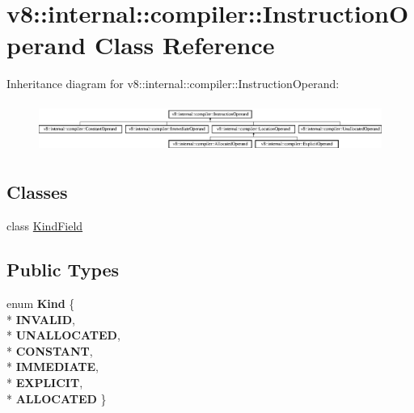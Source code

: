 \hypertarget{classv8_1_1internal_1_1compiler_1_1_instruction_operand}{}\section{v8\+:\+:internal\+:\+:compiler\+:\+:Instruction\+Operand Class Reference}
\label{classv8_1_1internal_1_1compiler_1_1_instruction_operand}
Inheritance diagram for v8\+:\+:internal\+:\+:compiler\+:\+:Instruction\+Operand\+:\begin{figure}[H]
\begin{center}
\leavevmode
\includegraphics[height=1.627907cm]{classv8_1_1internal_1_1compiler_1_1_instruction_operand}
\end{center}
\end{figure}
\subsection*{Classes}
\begin{DoxyCompactItemize}
\item 
class \hyperlink{classv8_1_1internal_1_1compiler_1_1_instruction_operand_1_1_kind_field}{Kind\+Field}
\end{DoxyCompactItemize}
\subsection*{Public Types}
\begin{DoxyCompactItemize}
\item 
enum {\bfseries Kind} \{ \\*
{\bfseries I\+N\+V\+A\+L\+ID}, 
\\*
{\bfseries U\+N\+A\+L\+L\+O\+C\+A\+T\+ED}, 
\\*
{\bfseries C\+O\+N\+S\+T\+A\+NT}, 
\\*
{\bfseries I\+M\+M\+E\+D\+I\+A\+TE}, 
\\*
{\bfseries E\+X\+P\+L\+I\+C\+IT}, 
\\*
{\bfseries A\+L\+L\+O\+C\+A\+T\+ED}
 \}\hypertarget{classv8_1_1internal_1_1compiler_1_1_instruction_operand_a8dfff4775cf07d442bb9e07ba81c4dcf}{}\label{classv8_1_1internal_1_1compiler_1_1_instruction_operand_a8dfff4775cf07d442bb9e07ba81c4dcf}

\end{DoxyCompactItemize}
